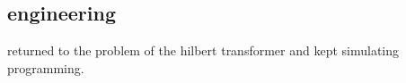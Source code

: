 \subsection*{engineering}
returned to the problem of the hilbert transformer and kept simulating \amp
programming.
